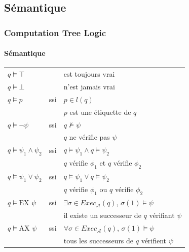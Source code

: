 \documentclass[11pt]{beamer}
\begin{document}
\subsection{Sémantique}
\begin{frame}
    \frametitle{Computation Tree Logic}
    \framesubtitle{Sémantique}

    \footnotesize
    \begin{tabular}{lcl}
    $q \vDash \top$ && est toujours vrai\\
    $q \vDash \bot$ && n'est jamais vrai\\
    $q \vDash p$ &ssi&
    $p \in l (q)$\\
    \pause[2]&& $p$ est une étiquette de $q$\pause[1]\\
    $q \vDash \neg \psi$ &ssi&
    $q \nvDash \psi$\\
    \pause[2]&& $q$ ne vérifie pas $\psi$\pause[1]\\

    $q \vDash \psi_1 \land \psi_2$ &ssi&
    $q \vDash \psi_1\land q \vDash \psi_2$\\
    \pause[2]&& $q$ vérifie $\phi_1$ et $q$ vérifie $\phi_2$\pause[1]\\

    $q \vDash \psi_1 \lor \psi_2$ &ssi&
    $q \vDash \psi_1\lor q \vDash \psi_2$\\
    \pause[2]&& $q$ vérifie $\phi_1$ ou $q$ vérifie $\phi_2$\pause[1]\\

    $q \vDash \mbox{EX } \psi$ &ssi&
    $\exists \sigma \in Exec_\mathcal{A}(q)$, $\sigma(1) \vDash \psi$\\
    \pause[2]&& il existe un successeur de $q$ vérifiant $\psi$\pause[1]\\

    $q \vDash \mbox{AX } \psi$ &ssi&
    $\forall \sigma \in Exec_\mathcal{A}(q)$, $\sigma(1) \vDash \psi$\\
    \pause[2]&& tous les successeurs de $q$ vérifient $\psi$\pause[1]\\

    \end{tabular}
\end{frame}
\end{document}
